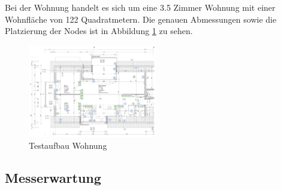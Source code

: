 Bei der Wohnung handelt es sich um eine 3.5 Zimmer Wohnung mit einer Wohnfläche von 122 Quadratmetern. Die genauen Abmessungen sowie die Platzierung der Nodes ist in Abbildung \ref{fig:TestaufbauWohnung} zu sehen.

\begin{figure}
	\centering
	\includegraphics[width=0.5\textwidth]{graphics/Plan_Wohnung_Cyrill_Nodes_Placement.png}
	\caption{Testaufbau Wohnung}
	\label{fig:TestaufbauWohnung}
\end{figure}

\subsection{Messerwartung}
